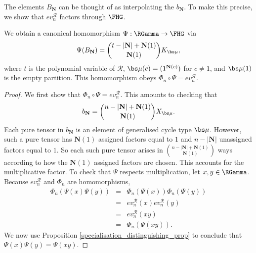 The elements $B_{\mathbf{N}}$ can be thought of as interpolating the $b_{\mathbf{N}}$. To make this precise, we show that $ev_n^{\mathcal{R}}$ factors through $\FHG$.

\begin{corollary} \label{coeff_compatibility_cor}
We obtain a canonical homomorphism $\Psi: \RGamma \to \FHG$ via
\[
\Psi( B_{\mathbf{N}}) = \binom{t - |\mathbf{N}| + \mathbf{N}(1)}{\mathbf{N}(1)} K_{\bs \mu},
\]
where $t$ is the polynomial variable of $\mathcal{R}$, $\bs \mu(c) = (1^{\mathbf{N}(c)})$ for $c \neq 1$, and $\bs \mu(1)$ is the empty partition. This homomorphism obeys $\Phi_n \circ \Psi = ev_n^{\mathcal{R}}$.
\end{corollary}
\begin{proof}
We first show that $\Phi_n \circ \Psi = ev_n^{\mathcal{R}}$. This amounts to checking that
\[
b_{\mathbf{N}} = \binom{n - |\mathbf{N}| + \mathbf{N}(1)}{\mathbf{N}(1)} X_{\bs \mu}.
\]
Each pure tensor in $b_{\mathbf{N}}$ is an element of generalised cycle type $\bs \mu$. However, such a pure tensor has $\mathbf{N}(1)$ assigned factors equal to $1$ and $n - |\mathbf{N}|$ unassigned factors equal to $1$. So each such pure tensor arises in $\binom{n - |\mathbf{N}| + \mathbf{N}(1)}{\mathbf{N}(1)}$ ways according to how the $\mathbf{N}(1)$ assigned factors are chosen. This accounts for the multiplicative factor. To check that $\Psi$ respects multiplication, let $x,y \in \RGamma$. Because $ev_n^{\mathcal{R}}$ and $\Phi_n$ are homomorphisms,
\begin{eqnarray*}
\Phi_n(\Psi(x)\Psi(y)) &=& \Phi_n(\Psi(x))\Phi_n(\Psi(y)) \\
&=& ev_n^{\mathcal{R}}(x) ev_n^{\mathcal{R}}(y) \\
&=& ev_n^{\mathcal{R}}(xy) \\
&=& \Phi_n(\Psi(xy)).
\end{eqnarray*}
We now use Proposition \ref{specialisation_distinguishing_prop} to conclude that $\Psi(x)\Psi(y) = \Psi(xy)$.
\end{proof}
